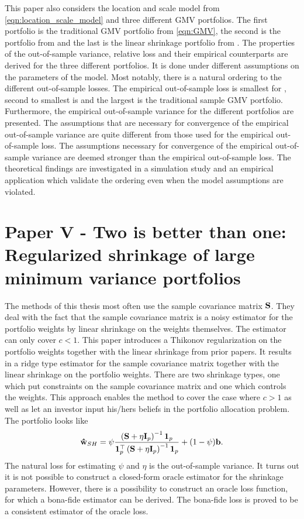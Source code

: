 \documentclass[12pt, twoside]{book}\usepackage{knitr}
\begin{document}
This paper also considers the location and scale model from \eqref{eqn:location_scale_model} and three different GMV portfolios. 
The first portfolio is the traditional GMV portfolio from \eqref{eqn:GMV}, the second is the portfolio from \citet{bodnar2018estimation} and the last is the linear shrinkage portfolio from \citet{frahm2010}.
The properties of the out-of-sample variance, relative loss and their empirical counterparts are derived for the three different portfolios. 
It is done under different assumptions on the parameters of the model.
Most notably, there is a natural ordering to the different out-of-sample losses.
The empirical out-of-sample loss is smallest for \citet{bodnar2018estimation}, second to smallest is \citet{frahm2010} and the largest is the traditional sample GMV portfolio.
Furthermore, the empirical out-of-sample variance for the different portfolios are presented.
The assumptions that are necessary for convergence of the empirical out-of-sample variance are quite different from those used for the empirical out-of-sample loss.
The assumptions necessary for convergence of the empirical out-of-sample variance are deemed stronger than the empirical out-of-sample loss.
The theoretical findings are investigated in a simulation study and an empirical application which validate the ordering even when the model assumptions are violated.

\section{Paper V - Two is better than one: Regularized shrinkage of large
minimum variance portfolios}\label{sec:paper5}
The methods of this thesis most often use the sample covariance matrix $\mathbf{S}$.
They deal with the fact that the sample covariance matrix is a noisy estimator for the portfolio weights by linear shrinkage on the weights themselves.
The estimator can only cover $c<1$.
This paper introduces a Thikonov regularization on the portfolio weights together with the linear shrinkage from prior papers. 
It results in a ridge type estimator for the sample covariance matrix together with the linear shrinkage on the portfolio weights.
There are two shrinkage types, one which put constraints on the sample covariance matrix and one which controls the weights.
This approach enables the method to cover the case where $c>1$ as well as let an investor input his/hers beliefs in the portfolio allocation problem.
The portfolio looks like
$$
\mathbf{\hat{w}}_{SH} = \psi \frac{\left(\mathbf{S} + \eta \mathbf{I}_p \right)^{-1}\mathbf{1}_p}{\mathbf{1}_p^\top\left(\mathbf{S} + \eta \mathbf{I}_p \right)^{-1}\mathbf{1}_p} + (1-\psi)\mathbf{b}.
$$
The natural loss for estimating $\psi$ and $\eta$ is the out-of-sample variance.
It turns out it is not possible to construct a closed-form oracle estimator for the shrinkage parameters.
However, there is a possibility to construct an oracle loss function, for which a bona-fide estimator can be derived.
The bona-fide loss is proved to be a consistent estimator of the oracle loss.
\end{document}
